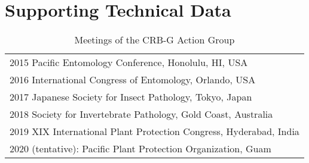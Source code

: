 \documentclass[11pt,english,letterpaper]{scrartcl}
\begin{document}
\clearpage

\section{Supporting Technical Data}


	


\begin{table}[h]
	\centering
	\caption{Meetings of the CRB-G Action Group}
	\begin{tabular}{l}
		\toprule
		2015 Pacific Entomology Conference, Honolulu, HI, USA \\
		2016 International Congress of Entomology, Orlando, USA \\
		2017 Japanese Society for Insect Pathology, Tokyo, Japan \\
		2018 Society for Invertebrate Pathology, Gold Coast, Australia \\
		2019 XIX International Plant Protection Congress, Hyderabad, India \\
		2020 (tentative): Pacific Plant Protection Organization, Guam \\
		\bottomrule
	\end{tabular}
	\label{tab:action-group}
\end{table}	
	
\end{document}
